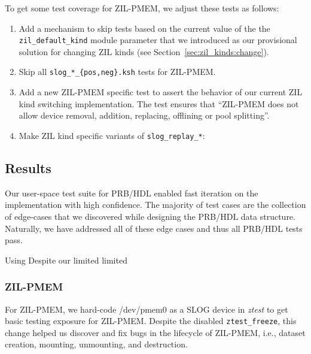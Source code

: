 \documentclass[12pt,a4paper,twoside]{book}
\begin{document}
To get some test coverage for ZIL-PMEM, we adjust these tests as follows:
\begin{enumerate}
    \item Add a mechanism to skip tests based on the current value of the the \lstinline{zil_default_kind} module parameter that we introduced as our provisional solution for changing ZIL kinds (see Section~\ref{sec:zil_kinds:change}).
    \item Skip all \lstinline|slog_*_{pos,neg}.ksh| tests for ZIL-PMEM.
    \item Add a new ZIL-PMEM specific test to assert the behavior of our current ZIL kind switching implementation.
        The test ensures that ``ZIL-PMEM does not allow device removal, addition, replacing, offlining or pool splitting''.
    \item Make ZIL kind specific variants of \lstinline{slog_replay_*}:
\end{enumerate}

\subsection{Results}

Our user-space test suite for PRB/HDL enabled fast iteration on the implementation with high confidence.
The majority of test cases are the collection of edge-cases that we discovered while designing the PRB/HDL data structure.
Naturally, we have addressed all of these edge cases and thus all PRB/HDL tests pass.

Using  Despite our limited limited 






\subsubsection{ZIL-PMEM}
For ZIL-PMEM, we hard-code /dev/pmem0 as a SLOG device in \textit{ztest} to get basic testing exposure for ZIL-PMEM.
Despite the disabled \lstinline{ztest_freeze}, this change helped us discover and fix bugs in the lifecycle of ZIL-PMEM, i.e., dataset creation, mounting, unmounting, and destruction.
\end{document}
